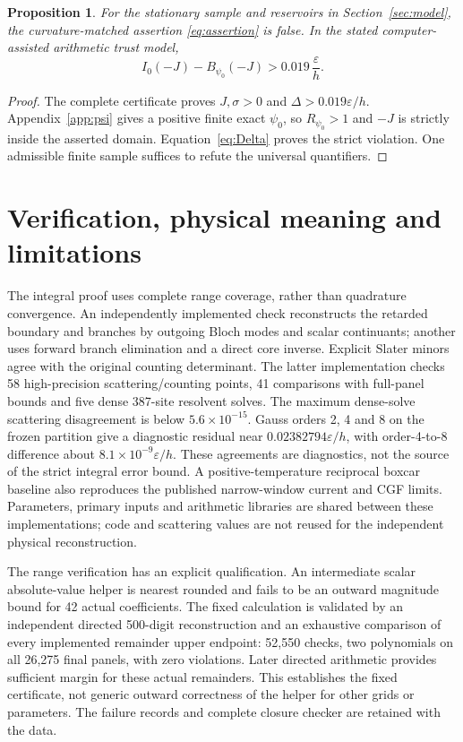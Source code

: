 \documentclass[11pt,a4paper]{article}
\newcommand{\ee}{\varepsilon}
\newtheorem{proposition}{Proposition}
\begin{document}
\begin{proposition}
For the stationary sample and reservoirs in
Section~\ref{sec:model}, the curvature-matched assertion
\eqref{eq:assertion} is false. In the stated computer-assisted arithmetic
trust model,
\begin{equation}
 I_0(-J)-B_{\psi_0}(-J)>0.019\,\frac{\ee}{h}.
\end{equation}
\end{proposition}
\begin{proof}
The complete certificate proves $J,\sigma>0$ and
$\Delta>0.019\ee/h$. Appendix~\ref{app:psi} gives a positive finite
exact $\psi_0$, so $R_{\psi_0}>1$ and $-J$ is strictly inside the asserted
domain. Equation~\eqref{eq:Delta} proves the strict violation. One admissible
finite sample suffices to refute the universal quantifiers.
\end{proof}

\section{Verification, physical meaning and limitations}

The integral proof uses complete range coverage, rather than quadrature
convergence. An independently implemented check reconstructs the retarded
boundary and branches by outgoing Bloch modes and scalar continuants;
another uses forward branch elimination and a direct core inverse.
Explicit Slater minors agree with the original counting determinant.
The latter implementation checks 58 high-precision scattering/counting
points, 41 comparisons with full-panel bounds and five dense 387-site
resolvent solves. The maximum dense-solve scattering disagreement is below
$5.6\times10^{-15}$. Gauss orders 2, 4 and 8 on the frozen partition give a
diagnostic residual near $0.02382794\ee/h$, with order-4-to-8 difference
about $8.1\times10^{-9}\ee/h$. These agreements are diagnostics, not the
source of the strict integral error bound. A positive-temperature reciprocal
boxcar baseline also reproduces the published narrow-window current and
CGF limits. Parameters, primary inputs and arithmetic libraries are shared
between these implementations; code and scattering values are not reused
for the independent physical reconstruction.

The range verification has an explicit qualification. An intermediate
scalar absolute-value helper is nearest rounded and fails to be an outward
magnitude bound for 42 actual coefficients. The fixed calculation is
validated by an independent directed 500-digit reconstruction and an
exhaustive comparison of every implemented remainder upper endpoint:
52,550 checks, two polynomials on all 26,275 final panels, with zero
violations. Later directed arithmetic provides sufficient margin for these
actual remainders. This establishes the fixed certificate, not generic
outward correctness of the helper for other grids or parameters. The
failure records and complete closure checker are retained with the data.
\end{document}
